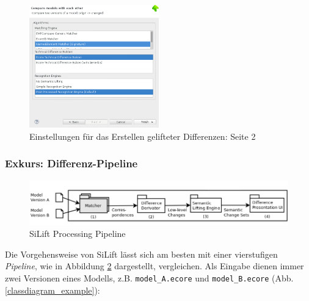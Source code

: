\documentclass[a4paper]{scrartcl}
\begin{document}
\begin{figure}[H]
\centering
\includegraphics[width=0.5\textwidth]{graphics/silift-wizard_compare_page2.png}
\caption{Einstellungen für das Erstellen gelifteter Differenzen: Seite 2}
\label{silift-wizard_compare_page2}
\end{figure}

\subsubsection*{Exkurs: Differenz-Pipeline}

\begin{figure}[H]
\centering
\includegraphics[width=\textwidth]{graphics/eclipse-SiLift_pipeline.png}
\caption{SiLift Processing Pipeline}
\label{install_SiLift_pipeline}
\end{figure}

Die Vorgehensweise von SiLift lässt sich am besten mit einer vierstufigen \textit{Pipeline}, wie in Abbildung \ref{install_SiLift_pipeline} dargestellt,  vergleichen.
Als Eingabe dienen immer zwei Versionen eines Modells, z.B. \texttt{model\_A.ecore} und \texttt{model\_B.ecore} (Abb. \ref{classdiagram_example}):
\end{document}
